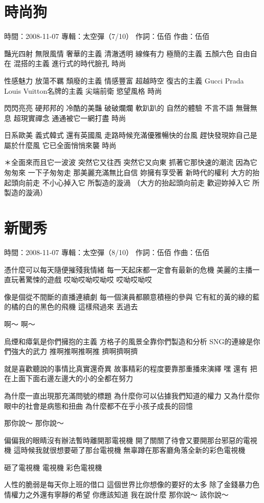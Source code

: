 \documentclass[UTF8,a4paper,oneside,twocolumn,12pt]{ctexbook}
\newcommand{\infopair}[2]{\textbullet #1：#2}
\newcommand{\zc}[1][伍佰]{\infopair{作詞}{#1}}
\newcommand{\zq}[1][伍佰]{\infopair{作曲}{#1}}
\newcommand{\zj}[1]{\infopair{專輯}{#1}}
\newcommand{\sj}[1]{\infopair{時間}{#1}}
\newenvironment{info}{\begin{flushleft}\kaishu
	}
	{\end{flushleft}\normalsize\yahei\par}
\newenvironment{lyric}{
	}
{}
\begin{document}
\section{時尚狗}
\begin{info}
	\sj{2008-11-07}
	\zj{太空彈（7/10）}
	\zc
	\zq
\end{info}
\begin{lyric}
	豔光四射 無限風情 奢華的主義
	清澈透明 線條有力 極簡的主義
	五顏六色 自由自在 混搭的主義
	進行式的時代臉孔 時尚

	性感魅力 放蕩不羈 頹廢的主義
	情感豐富 超越時空 復古的主義
	Gucci Prada Louis Vuitton名牌的主義
	尖端前衛 慾望風格 時尚

	閃閃亮亮 硬邦邦的 冷酷的美豔
	破破爛爛 軟趴趴的 自然的體驗
	不言不語 無聲無息 超現實禪念
	通通被它一網打盡 時尚

	日系歐美 義式韓式 還有英國風
	走路時候充滿優雅暢快的台風
	趕快發現妳自己是屬於什麼風
	它已全面悄悄來襲 時尚

	＊全面來而且它一波波 突然它又往西 突然它又向東
	抓著它那快速的潮流 因為它匆匆來 一下子匆匆走
	那美麗充滿無比自信 妳擁有享受著 新時代的權利
	大方的抬起頭向前走 不小心掉入它 所製造的漩渦
	（大方的抬起頭向前走 歡迎妳掉入它 所製造的漩渦）
\end{lyric}

\section{新聞秀}
\begin{info}
	\sj{2008-11-07}
	\zj{太空彈（8/10）}
	\zc
	\zq
\end{info}
\begin{lyric}
	憑什麼可以每天隨便摧殘我情緒
	每一天起床都一定會有最新的危機
	美麗的主播一直玩著驚悚的遊戲
	哎呦哎呦哎呦哎 哎呦哎呦哎

	像是個從不間斷的直播連續劇
	每一個演員都願意積極的參與
	它有紅的黃的綠的藍的橘的白的黑色的飛機
	這樣飛過來 丟過去

	啊～
	啊～

	烏煙和瘴氣是你們擁抱的主義
	方格子的風景全靠你們製造和分析
	SNG的連線是你們強大的武力
	推啊推啊推啊推 擠啊擠啊擠

	就是喜歡聽說的事情比真實還奇異
	故事精彩的程度要靠那重播來演繹
	嘿 還有
	把在上面下面右邊左邊大的小的全都在努力

	為什麼一直出現那充滿問號的標題
	為什麼你可以佔據我們知道的權力
	又為什麼你眼中的社會是病態和扭曲
	為什麼都不在乎小孩子成長的回憶

	那你說～ 那你說～

	偏偏我的眼睛沒有辦法暫時離開那電視機
	開了關關了待會又要開那台邪惡的電視機
	這時候我就很想要砸了那台電視機
	無辜蹲在那客廳角落全新的彩色電視機

	砸了電視機 電視機 彩色電視機

	人性的脆弱是每天你上班的借口
	這個世界比你想像的要好的太多
	除了金錢暴力色情權力之外還有寧靜的希望
	你應該知道 我在說什麼
	那你說～ 該你說～
\end{lyric}
\end{document}

